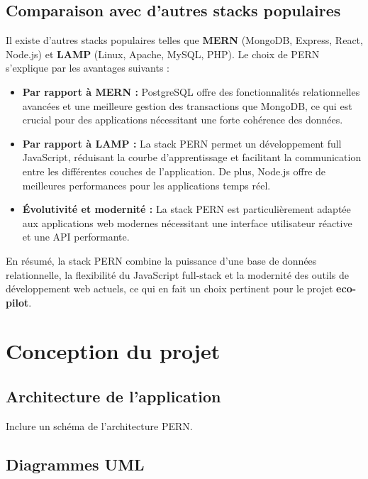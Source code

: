 \documentclass[12pt,a4paper]{report}
\begin{document}
\section*{Comparaison avec d’autres stacks populaires}

Il existe d’autres stacks populaires telles que \textbf{MERN} (MongoDB, Express, React, Node.js) et \textbf{LAMP} (Linux, Apache, MySQL, PHP). Le choix de PERN s’explique par les avantages suivants :

\begin{itemize}
    \item \textbf{Par rapport à MERN :} PostgreSQL offre des fonctionnalités relationnelles avancées et une meilleure gestion des transactions que MongoDB, ce qui est crucial pour des applications nécessitant une forte cohérence des données.
    \item \textbf{Par rapport à LAMP :} La stack PERN permet un développement full JavaScript, réduisant la courbe d’apprentissage et facilitant la communication entre les différentes couches de l’application. De plus, Node.js offre de meilleures performances pour les applications temps réel.
    \item \textbf{Évolutivité et modernité :} La stack PERN est particulièrement adaptée aux applications web modernes nécessitant une interface utilisateur réactive et une API performante.
\end{itemize}

En résumé, la stack PERN combine la puissance d’une base de données relationnelle, la flexibilité du JavaScript full-stack et la modernité des outils de développement web actuels, ce qui en fait un choix pertinent pour le projet \textbf{eco-pilot}.

\chapter{Conception du projet}
\section{Architecture de l’application}
Inclure un schéma de l’architecture PERN.  

\section{Diagrammes UML}
\end{document}

